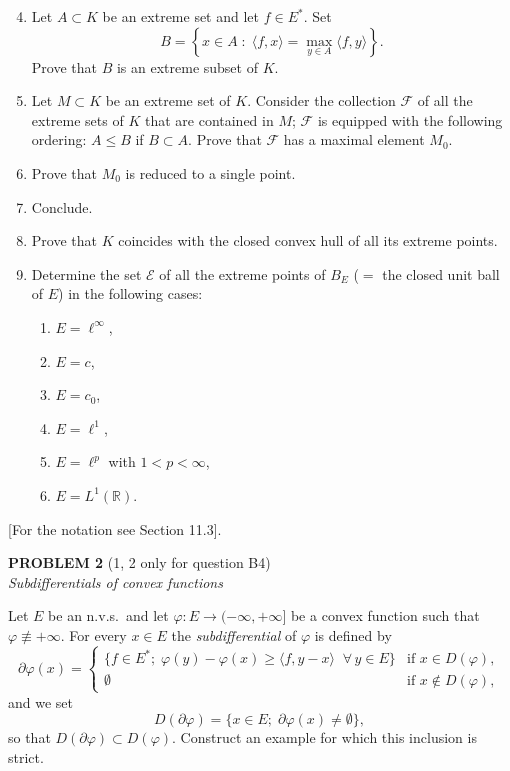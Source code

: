 \documentclass[12pt]{article}
\newcommand{\ip}[2]{\langle #1, #2 \rangle}
\begin{document}
\begin{enumerate}
\setcounter{enumi}{3}
\item Let $A \subset K$ be an extreme set and let $f \in E^*$. Set
\[
B = \left\{ x \in A \;:\; \ip{f}{x} = \max_{y \in A} \ip{f}{y} \right\}.
\]
Prove that $B$ is an extreme subset of $K$.

\item Let $M \subset K$ be an extreme set of $K$. Consider the collection $\mathcal{F}$ of all the extreme
sets of $K$ that are contained in $M$; $\mathcal{F}$ is equipped with the following ordering:
$A \le B$ if $B \subset A$.
Prove that $\mathcal{F}$ has a maximal element $M_0$.

\item Prove that $M_0$ is reduced to a single point.


\item Conclude.

\item Prove that $K$ coincides with the closed convex hull of all its extreme points.


\item Determine the set $\mathcal{E}$ of all the extreme points of $B_E$ ($= $ the closed unit ball of $E$)
in the following cases:
\begin{enumerate}
    \item $E = \ell^\infty$,
    \item $E = c$,
    \item $E = c_0$,
    \item $E = \ell^1$,
    \item $E = \ell^p$ with $1 < p < \infty$,
    \item $E = L^1(\mathbb{R})$.
\end{enumerate}

\end{enumerate}

[For the notation see Section 11.3].
\bigskip

\noindent\textbf{PROBLEM 2} (1, 2 only for question B4)\\[4pt]
\textit{Subdifferentials of convex functions}

\medskip

Let $E$ be an n.v.s.\ and let $\varphi : E \to (-\infty, +\infty]$ be a convex function such that
$\varphi \not\equiv +\infty$. For every $x \in E$ the \emph{subdifferential} of $\varphi$ is defined by
\[
\partial\varphi(x) =
\begin{cases}
\{f \in E^*;\; \varphi(y) - \varphi(x) \ge \ip{f}{y-x}\;\; \forall\, y \in E\} & \text{if } x \in D(\varphi),\\
\emptyset & \text{if } x \notin D(\varphi),
\end{cases}
\]
and we set
\[
D(\partial\varphi) = \{x \in E;\; \partial\varphi(x) \neq \emptyset\},
\]
so that $D(\partial\varphi) \subset D(\varphi)$. Construct an example for which this inclusion is strict.
\end{document}
